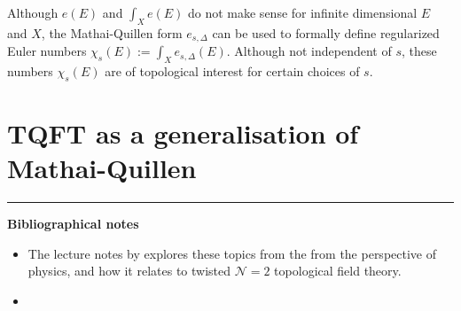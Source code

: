 Although $e(E)$ and  $\int_X e(E)$ do not make sense for
infinite dimensional  $E$ and  $X$, the Mathai-Quillen form  $e_{s,\Delta}$ can
be used to formally define regularized Euler numbers $\chi_s(E) := \int_X
e_{s,\Delta}(E)$. Although not independent of $s$, these numbers  $\chi_s(E)$
are of topological interest for certain choices of  $s$.  



\section{TQFT as a generalisation of Mathai-Quillen}


\vspace{5mm}
\hrule 
\vspace{5mm}

\textbf{Bibliographical notes}
{\small
\begin{itemize}
	\item The lecture notes by \citet{cordes95} explores these topics from the
	from the perspective of physics, and how it relates to twisted
	$\mathcal{N}=2$ topological field theory.
	\item 
\end{itemize}
}


